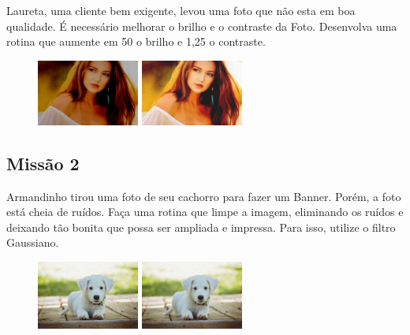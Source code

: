 \documentclass[
	12pt,				%
	oneside,			%
	a4paper,			%
	english,			%
	french,				%
	spanish,			%
	brazil,				%
	]{abntex2}
\begin{document}
\begin{apendicesenv}
Laureta, uma cliente bem exigente, levou uma foto que não esta em boa qualidade. É necessário melhorar o brilho e o contraste da Foto. Desenvolva uma rotina que aumente em 50 o brilho e 1,25 o contraste.

\begin{figure}[H]
\centering
\includegraphics[width=0.3\textwidth]{imagens/desafioestudio/mission1_input.jpg}
\includegraphics[width=0.3\textwidth]{imagens/desafioestudio/mission1_output.png}
\end{figure}

\subsection{Missão 2}

Armandinho tirou uma foto de seu cachorro para fazer um Banner. Porém, a foto está cheia de ruídos. Faça uma rotina que limpe a imagem, eliminando os ruídos e deixando tão bonita que possa ser ampliada e impressa. Para isso, utilize o filtro Gaussiano.

\begin{figure}[H]
\centering
\includegraphics[width=0.3\textwidth]{imagens/desafioestudio/mission2_input.jpg}
\includegraphics[width=0.3\textwidth]{imagens/desafioestudio/mission2_output.png}
\end{figure}


\end{apendicesenv}
\end{document}
